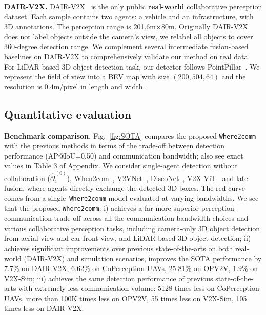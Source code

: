 \documentclass{article}
\begin{document}
\textbf{DAIR-V2X.} DAIR-V2X~\cite{dair} is the only public \textbf{real-world} collaborative perception dataset. Each sample contains two agents: a vehicle and an infrastructure, with 3D annotations. The perception range is 201.6m$\times$80m.  Originally DAIR-V2X does not label objects outside the camera's view, we relabel all objects to cover 360-degree detection range. We complement several intermediate fusion-based baselines on DAIR-V2X to comprehensively validate our method on real data. For LiDAR-based 3D object detection task, our detector follows PointPillar~\cite{PointPillar}. We represent the field of view into a BEV map with size $(200, 504, 64)$ and the resolution is $0.4$m/pixel in length and width.




\vspace{-2mm}
\subsection{Quantitative evaluation}
\vspace{-2mm}




\textbf{Benchmark comparison.} Fig.~\ref{fig:SOTA} compares the proposed \texttt{Where2comm} with the previous methods in terms of the trade-off between detection performance (AP@IoU=0.50) and communication bandwidth; also see exact values in Table 3 of Appendix. We consider single-agent detection without collaboration ($\widehat{\mathcal{O}}_i^{(0)}$), When2com~\cite{when2com}, V2VNet~\cite{v2vnet}, DiscoNet~\cite{disconet}, V2X-ViT~\cite{xu2022v2x} and late fusion, where agents directly exchange the detected 3D boxes. The red curve comes from a single~\texttt{Where2comm} model evaluated at varying bandwidths. We see that the proposed \texttt{Where2comm}: i) achieves a far-more superior perception-communication trade-off across all the communication bandwidth choices and various collaborative perception tasks, including camera-only 3D object detection from aerial view and car front view, and LiDAR-based 3D object detection; ii) achieves significant improvements over previous state-of-the-arts on both real-world (DAIR-V2X) and simulation scenarios, improves the SOTA performance by 7.7\% on DAIR-V2X, 6.62\% on CoPerception-UAVs, 25.81\% on OPV2V, 1.9\% on V2X-Sim; iii) achieves the same detection performance of previous state-of-the-arts with extremely less communication volume: 5128 times less on CoPerception-UAVs, more than 100K times less on OPV2V, 55 times less on V2X-Sim, 105 times less on DAIR-V2X.
\end{document}
